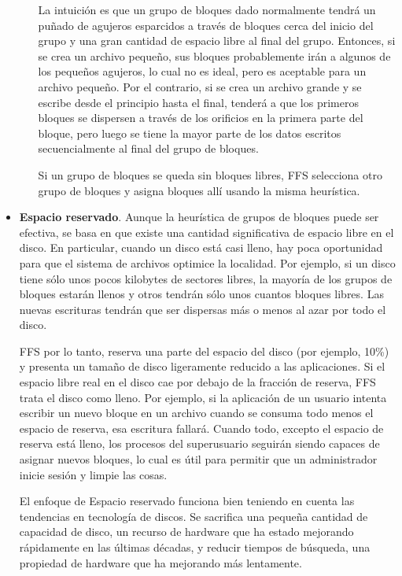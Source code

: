 \documentclass[10pt]{book}
\begin{document}
\begin{itemize}
\begin{enumerate}
La intuición es que un grupo de bloques dado normalmente tendrá un puñado de agujeros esparcidos a través de bloques cerca del inicio del grupo y una gran cantidad de espacio libre al final del grupo. Entonces, si se crea un archivo pequeño, sus bloques probablemente irán a algunos de los pequeños agujeros, lo cual no es ideal, pero es aceptable para un archivo pequeño. Por el contrario, si se crea un archivo grande y se escribe desde el principio hasta el final, tenderá a que los primeros bloques se dispersen a través de los orificios en la primera parte del bloque, pero luego se tiene la mayor parte de los datos escritos secuencialmente al final del grupo de bloques.

Si un grupo de bloques se queda sin bloques libres, FFS selecciona otro grupo de bloques y asigna bloques allí usando la misma heurística.
\end{enumerate}

\item \textbf{Espacio reservado}. Aunque la heurística de grupos de bloques puede ser efectiva, se basa en que existe una cantidad significativa de espacio libre en el disco. En particular, cuando un disco está casi lleno, hay poca oportunidad para que el sistema de archivos optimice la localidad. Por ejemplo, si un disco tiene sólo unos pocos kilobytes de sectores libres, la mayoría de los grupos de bloques estarán llenos y otros tendrán sólo unos cuantos bloques libres. Las nuevas escrituras tendrán que ser dispersas más o menos al azar por todo el disco.

FFS por lo tanto, reserva una parte del espacio del disco (por ejemplo, 10\%) y presenta un tamaño de disco ligeramente reducido a las aplicaciones. Si el espacio libre real en el disco cae por debajo de la fracción de reserva, FFS trata el disco como lleno. Por ejemplo, si la aplicación de un usuario intenta escribir un nuevo bloque en un archivo cuando se consuma todo menos el espacio de reserva, esa escritura fallará. Cuando todo, excepto el espacio de reserva está lleno, los procesos del superusuario seguirán siendo capaces de asignar nuevos bloques, lo cual es útil para permitir que un administrador inicie sesión y limpie las cosas.

El enfoque de Espacio reservado funciona bien teniendo en cuenta las tendencias en tecnología de discos. Se sacrifica una pequeña cantidad de capacidad de disco, un recurso de hardware que ha estado mejorando rápidamente en las últimas décadas, y reducir tiempos de búsqueda, una propiedad de hardware que ha mejorando más lentamente.
\end{itemize}
\end{document}
